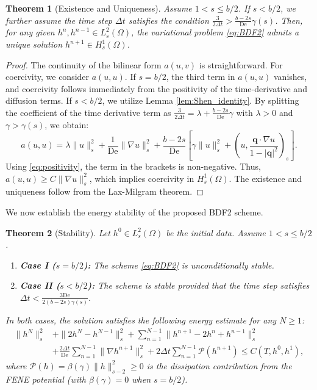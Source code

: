 \documentclass[preprint,12pt]{elsarticle}
\newtheorem{theorem}{Theorem}[section]
\begin{document}
\begin{theorem}[Existence and Uniqueness]
Assume $1 < s \le b/2$. If $s < b/2$, we further assume the time step $\Delta t$ satisfies the condition $\frac{3}{2\Delta t} > \frac{b-2s}{\mathrm{De}}\gamma(s)$. Then, for any given $h^n, h^{n-1} \in L^2_s(\Omega)$, the variational problem \eqref{eq:BDF2} admits a unique solution $h^{n+1} \in H_s^1(\Omega)$.
\end{theorem}

\begin{proof}
The continuity of the bilinear form $a(u,v)$ is straightforward. For coercivity, we consider $a(u,u)$. 
If $s = b/2$, the third term in $a(u,u)$ vanishes, and coercivity follows immediately from the positivity of the time-derivative and diffusion terms. 
If $s < b/2$, we utilize Lemma \ref{lem:Shen_identity}. By splitting the coefficient of the time derivative term as $\frac{3}{2\Delta t} = \lambda + \frac{b-2s}{\text{De}}\gamma$ with $\lambda > 0$ and $\gamma > \gamma(s)$, we obtain:
\begin{equation}
    a(u, u) = \lambda \|u\|_s^2 + \frac{1}{\text{De}}\|\nabla u\|_s^2 + \frac{b-2s}{\text{De}}\left[ \gamma \|u\|_s^2 + \left(u, \frac{\bm{q}\cdot \nabla u}{1-|\bm{q}|^2}\right)_s \right].
\end{equation}
Using \eqref{eq:positivity}, the term in the brackets is non-negative. Thus, $a(u,u) \ge C \|\nabla u\|_s^2$, which implies coercivity in $H_s^1(\Omega)$. The existence and uniqueness follow from the Lax-Milgram theorem.
\end{proof}

We now establish the energy stability of the proposed BDF2 scheme.

\begin{theorem}[Stability]
\label{thm:stability}
Let $h^0 \in L^2_s(\Omega)$ be the initial data. Assume $1 < s \le b/2$. 
\begin{enumerate}
    \item \textbf{Case I ($s = b/2$):} The scheme \eqref{eq:BDF2} is unconditionally stable.
    \item \textbf{Case II ($s < b/2$):} The scheme is stable provided that the time step satisfies $\Delta t < \frac{3\mathrm{De}}{2(b-2s)\gamma(s)}$.
\end{enumerate}
In both cases, the solution satisfies the following energy estimate for any $N \ge 1$:
\begin{equation}
\begin{aligned}
    \|h^N\|_s^2 &+ \|2h^N - h^{N-1}\|_s^2 + \sum_{n=1}^{N-1} \|h^{n+1} - 2h^n + h^{n-1}\|_s^2 \\
    &+ \frac{2\Delta t}{\text{De}} \sum_{n=1}^{N-1} \|\nabla h^{n+1}\|_s^2 + 2\Delta t \sum_{n=1}^{N-1} \mathcal{P}(h^{n+1}) \le C(T, h^0, h^1),
\end{aligned}
\end{equation}
where $\mathcal{P}(h) = \beta(\gamma)\|h\|_{s-2}^2 \ge 0$ is the dissipation contribution from the FENE potential (with $\beta(\gamma)=0$ when $s=b/2$).
\end{theorem}
\end{document}
